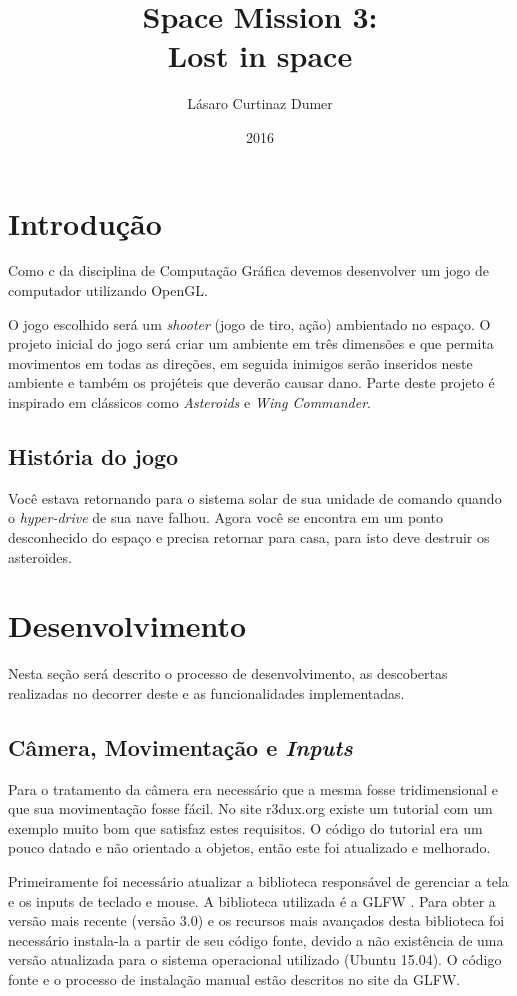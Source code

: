 \documentclass{article}
\title{Space Mission 3: \\Lost in space}
\author{Lásaro Curtinaz Dumer }
\date{2016}
\begin{document}
\maketitle

\section{Introdução}

Como c da disciplina de Computação Gráfica devemos desenvolver um jogo de computador utilizando OpenGL.


O jogo escolhido será um \textit{shooter} (jogo de tiro, ação) ambientado no espaço. O projeto inicial do jogo será criar um ambiente em três dimensões e que permita movimentos em todas as direções, em seguida inimigos serão inseridos neste ambiente e também os projéteis que deverão causar dano. Parte deste projeto é inspirado em clássicos como \textit{Asteroids} e \textit{Wing Commander}.


\subsection{História do jogo}
Você estava retornando para o sistema solar de sua unidade de comando quando o \textit{hyper-drive} de sua nave falhou. Agora você se encontra em um ponto desconhecido do espaço e precisa retornar para casa, para isto deve destruir os asteroides.

\section{Desenvolvimento}

Nesta seção será descrito o processo de desenvolvimento, as descobertas realizadas no decorrer deste e as funcionalidades implementadas.

\subsection{Câmera, Movimentação e \textit{Inputs}}

Para o tratamento da câmera era necessário que a mesma fosse tridimensional e que sua movimentação fosse fácil. No site r3dux.org \citep{R3DUX} existe um tutorial com um exemplo muito bom que satisfaz estes requisitos. O código do tutorial era um pouco datado e não orientado a objetos, então este foi atualizado e melhorado.


Primeiramente foi necessário atualizar a biblioteca responsável de gerenciar a tela e os inputs de teclado e mouse. A biblioteca utilizada é a GLFW \citep{GLFW}. Para obter a versão mais recente (versão 3.0) e os recursos mais avançados desta biblioteca foi necessário instala-la a partir de seu código fonte, devido a não existência de uma versão atualizada para o sistema operacional utilizado (Ubuntu 15.04). O código fonte e o processo de instalação manual estão descritos no site da GLFW.
\end{document}
